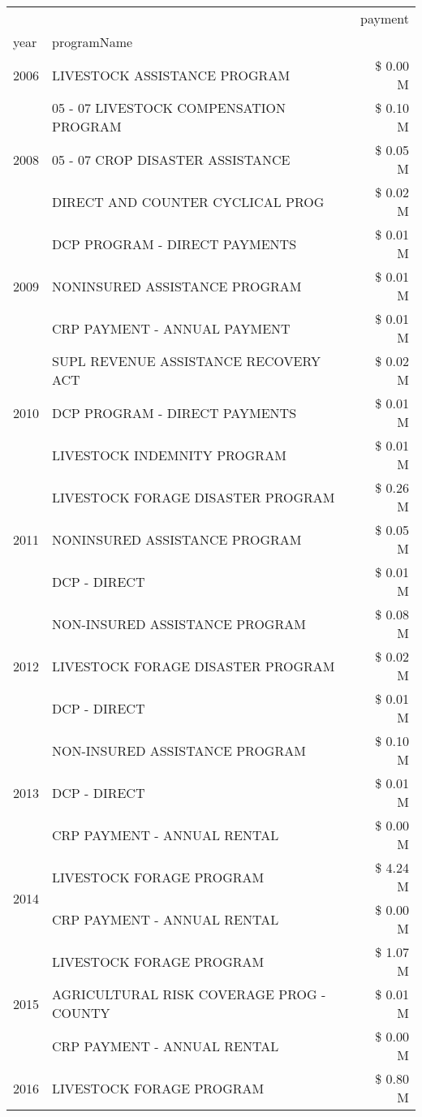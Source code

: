 \begin{tabular}{llr}
\toprule
 &  & payment \\
year & programName &  \\
\midrule
2006 & LIVESTOCK ASSISTANCE PROGRAM & \$ 0.00 M \\
\cline{1-3}
\multirow[t]{3}{*}{2008} & 05 - 07 LIVESTOCK COMPENSATION PROGRAM & \$ 0.10 M \\
 & 05 - 07 CROP DISASTER ASSISTANCE & \$ 0.05 M \\
 & DIRECT AND COUNTER CYCLICAL PROG & \$ 0.02 M \\
\cline{1-3}
\multirow[t]{3}{*}{2009} & DCP PROGRAM - DIRECT PAYMENTS & \$ 0.01 M \\
 & NONINSURED ASSISTANCE PROGRAM & \$ 0.01 M \\
 & CRP PAYMENT - ANNUAL PAYMENT & \$ 0.01 M \\
\cline{1-3}
\multirow[t]{3}{*}{2010} & SUPL REVENUE ASSISTANCE RECOVERY ACT & \$ 0.02 M \\
 & DCP PROGRAM - DIRECT PAYMENTS & \$ 0.01 M \\
 & LIVESTOCK INDEMNITY PROGRAM & \$ 0.01 M \\
\cline{1-3}
\multirow[t]{3}{*}{2011} & LIVESTOCK FORAGE DISASTER PROGRAM & \$ 0.26 M \\
 & NONINSURED ASSISTANCE PROGRAM & \$ 0.05 M \\
 & DCP - DIRECT & \$ 0.01 M \\
\cline{1-3}
\multirow[t]{3}{*}{2012} & NON-INSURED ASSISTANCE PROGRAM & \$ 0.08 M \\
 & LIVESTOCK FORAGE DISASTER PROGRAM & \$ 0.02 M \\
 & DCP - DIRECT & \$ 0.01 M \\
\cline{1-3}
\multirow[t]{3}{*}{2013} & NON-INSURED ASSISTANCE PROGRAM & \$ 0.10 M \\
 & DCP - DIRECT & \$ 0.01 M \\
 & CRP PAYMENT - ANNUAL RENTAL & \$ 0.00 M \\
\cline{1-3}
\multirow[t]{2}{*}{2014} & LIVESTOCK FORAGE PROGRAM & \$ 4.24 M \\
 & CRP PAYMENT - ANNUAL RENTAL & \$ 0.00 M \\
\cline{1-3}
\multirow[t]{3}{*}{2015} & LIVESTOCK FORAGE PROGRAM & \$ 1.07 M \\
 & AGRICULTURAL RISK COVERAGE PROG - COUNTY & \$ 0.01 M \\
 & CRP PAYMENT - ANNUAL RENTAL & \$ 0.00 M \\
\cline{1-3}
\multirow[t]{3}{*}{2016} & LIVESTOCK FORAGE PROGRAM                      & \$ 0.80 M \\

\end{tabular}
